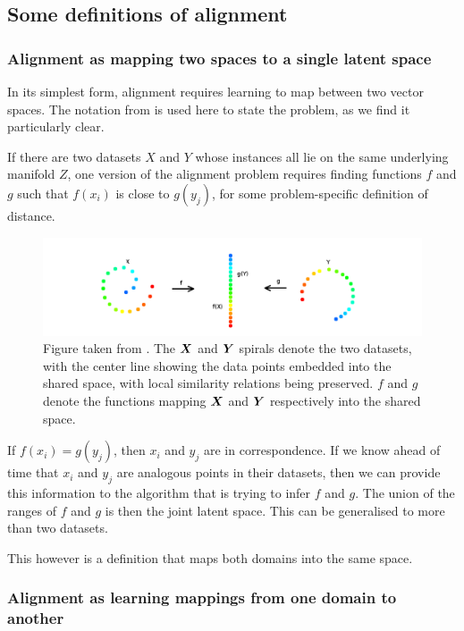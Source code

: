 \subsection{Some definitions of alignment}

\subsubsection{Alignment as mapping two spaces to a single latent space}
In its simplest form, alignment requires learning to map between two vector spaces. The notation from \cite{ManifoldLearningTheoryAndApplications} is used here to state the problem, as we find it particularly clear.

If there are two datasets $X$ and $Y$ whose instances all lie on the same underlying manifold $Z$, one version of the alignment problem requires finding functions $f$ and $g$ such that $f(x_i)$ is close  to $g(y_j)$, for some problem-specific definition of distance.

\begin{figure}[H]
    \centering
    \includegraphics[width=\textwidth]{images/review/alignment.png}
    \caption{
        Figure taken from \cite{ManifoldLearningTheoryAndApplications}. The $\boldsymbol{X}$ and $\boldsymbol{Y}$ spirals denote the two datasets, with the center line showing the data points embedded into the shared space, with local similarity relations being preserved. $f$ and $g$ denote the functions mapping $\boldsymbol{X}$ and $\boldsymbol{Y}$ respectively into the shared space. 
    }
\end{figure}

If $f(x_i) = g(y_j)$, then $x_i$ and $y_j$ are in correspondence. If we know ahead of time that $x_i$ and $y_j$ are analogous points in their datasets, then we can provide this information to the algorithm that is trying to infer $f$ and $g$. The union of the ranges of $f$ and $g$ is then the joint latent space. This can be generalised to more than two datasets. 

This however is a definition that maps both domains into the same space. 

\subsubsection{Alignment as learning mappings from one domain to another}

